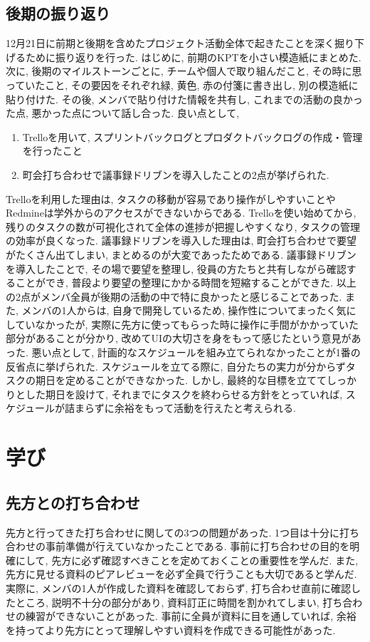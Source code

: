 \section{後期の振り返り}
12月21日に前期と後期を含めたプロジェクト活動全体で起きたことを深く掘り下げるために振り返りを行った. はじめに, 前期のKPTを小さい模造紙にまとめた.
次に, 後期のマイルストーンごとに, チームや個人で取り組んだこと, その時に思っていたこと, その要因をそれぞれ緑, 黄色, 赤の付箋に書き出し, 別の模造紙に貼り付けた.
その後, メンバで貼り付けた情報を共有し, これまでの活動の良かった点, 悪かった点について話し合った. 良い点として,
\begin{enumerate}
    \item Trelloを用いて, スプリントバックログとプロダクトバックログの作成・管理を行ったこと
    \item 町会打ち合わせで議事録ドリブンを導入したことの2点が挙げられた.
\end{enumerate}
Trelloを利用した理由は, タスクの移動が容易であり操作がしやすいことやRedmineは学外からのアクセスができないからである.
Trelloを使い始めてから, 残りのタスクの数が可視化されて全体の進捗が把握しやすくなり, タスクの管理の効率が良くなった. 議事録ドリブンを導入した理由は, 町会打ち合わせで要望がたくさん出てしまい,
まとめるのが大変であったためである. 議事録ドリブンを導入したことで, その場で要望を整理し, 役員の方たちと共有しながら確認することができ, 普段より要望の整理にかかる時間を短縮することができた.
以上の2点がメンバ全員が後期の活動の中で特に良かったと感じることであった. また, メンバの1人からは, 自身で開発しているため, 操作性についてまったく気にしていなかったが,
実際に先方に使ってもらった時に操作に手間がかかっていた部分があることが分かり, 改めてUIの大切さを身をもって感じたという意見があった.
悪い点として, 計画的なスケジュールを組み立てられなかったことが1番の反省点に挙げられた. スケジュールを立てる際に, 自分たちの実力が分からずタスクの期日を定めることができなかった.
しかし, 最終的な目標を立ててしっかりとした期日を設けて, それまでにタスクを終わらせる方針をとっていれば, スケジュールが詰まらずに余裕をもって活動を行えたと考えられる.

\chapter{学び}
\section{先方との打ち合わせ}
先方と行ってきた打ち合わせに関しての3つの問題があった.
1つ目は十分に打ち合わせの事前準備が行えていなかったことである. 事前に打ち合わせの目的を明確にして, 先方に必ず確認すべきことを定めておくことの重要性を学んだ.
また, 先方に見せる資料のピアレビューを必ず全員で行うことも大切であると学んだ. 実際に, メンバの1人が作成した資料を確認しておらず, 打ち合わせ直前に確認したところ, 説明不十分の部分があり,
資料訂正に時間を割かれてしまい, 打ち合わせの練習ができないことがあった. 事前に全員が資料に目を通していれば, 余裕を持ってより先方にとって理解しやすい資料を作成できる可能性があった.

